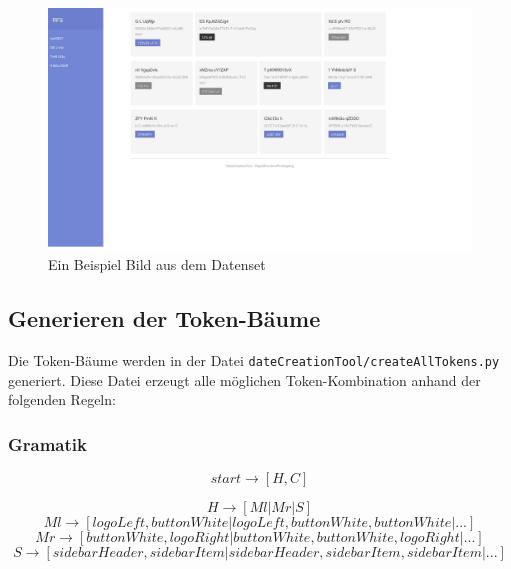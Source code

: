 \documentclass[pdftex,a4paper,halfparskip, article]{scrartcl}
\begin{document}
\begin{figure}[h]
\centering
\includegraphics[width=1\textwidth]{beispiel_daten}
\caption{Ein Beispiel Bild aus dem Datenset}
\label{fig:beispiel_daten}
\end{figure}

\subsection{Generieren der Token-Bäume}
Die Token-Bäume werden in der Datei \texttt{dateCreationTool/createAllTokens.py} generiert. Diese Datei erzeugt alle möglichen Token-Kombination anhand der folgenden Regeln:

\subsubsection{Gramatik}

\begin{equation}
start \rightarrow [H,C]
\end{equation}

\begin{equation}
H \rightarrow [Ml | Mr | S]
\end{equation}
\begin{equation}
Ml \rightarrow  [ logoLeft, buttonWhite | logoLeft, buttonWhite, buttonWhite | ...]
\end{equation}
\begin{equation}
Mr \rightarrow [buttonWhite, logoRight | buttonWhite, buttonWhite, logoRight | ...]
\end{equation}
\begin{equation}
S \rightarrow [sidebarHeader, sidebarItem| sidebarHeader, sidebarItem, sidebarItem | ...]
\end{equation}
\end{document}
